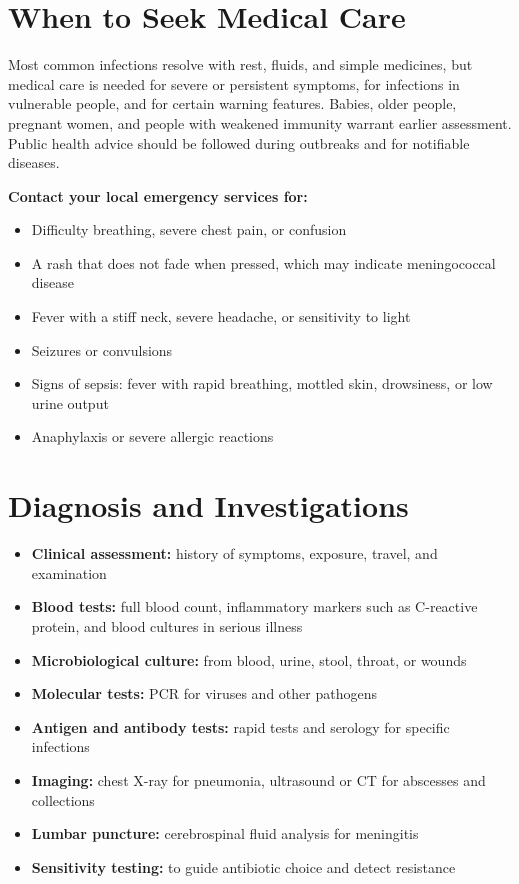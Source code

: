 \section*{When to Seek Medical Care}
Most common infections resolve with rest, fluids, and simple medicines, but medical care is needed for severe or persistent symptoms, for infections in vulnerable people, and for certain warning features. Babies, older people, pregnant women, and people with weakened immunity warrant earlier assessment. Public health advice should be followed during outbreaks and for notifiable diseases.

\textbf{Contact your local emergency services for:}
\begin{itemize}
    \item Difficulty breathing, severe chest pain, or confusion
    \item A rash that does not fade when pressed, which may indicate meningococcal disease
    \item Fever with a stiff neck, severe headache, or sensitivity to light
    \item Seizures or convulsions
    \item Signs of sepsis: fever with rapid breathing, mottled skin, drowsiness, or low urine output
    \item Anaphylaxis or severe allergic reactions
\end{itemize}

\section*{Diagnosis and Investigations}
\begin{itemize}
    \item \textbf{Clinical assessment:} history of symptoms, exposure, travel, and examination
    \item \textbf{Blood tests:} full blood count, inflammatory markers such as C-reactive protein, and blood cultures in serious illness
    \item \textbf{Microbiological culture:} from blood, urine, stool, throat, or wounds
    \item \textbf{Molecular tests:} PCR for viruses and other pathogens
    \item \textbf{Antigen and antibody tests:} rapid tests and serology for specific infections
    \item \textbf{Imaging:} chest X-ray for pneumonia, ultrasound or CT for abscesses and collections
    \item \textbf{Lumbar puncture:} cerebrospinal fluid analysis for meningitis
    \item \textbf{Sensitivity testing:} to guide antibiotic choice and detect resistance
\end{itemize}

